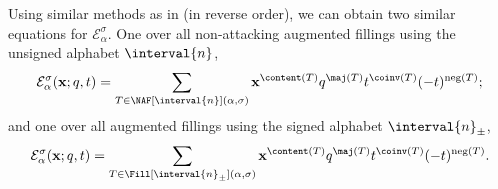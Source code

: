 Using similar methods as in \cite{HHL05} (in reverse order),
we can obtain two similar equations for \(\mathcal{E}_\alpha^\sigma\).
One over all non-attacking augmented fillings using the unsigned alphabet \(\interval{n}\),
\begin{equation} \label{eq:calE-NAF-signed}
	\mathcal{E}^{\sigma}_{\alpha}(\mathbf{x}; q, t) =
	\sum_{T \in \NAF[\interval{n}](\alpha, \sigma)}
	\mathbf{x}^{\content(T)}
	q^{\maj(T)} t^{\coinv(T)}
	(-t)^{\operatorname{neg}(T)};
\end{equation}
and one over all augmented fillings using the signed alphabet \(\interval{n}_\pm\),
\begin{equation} \label{eq:calE-Fill-signed}
	\mathcal{E}^{\sigma}_{\alpha}(\mathbf{x}; q, t) =
	\sum_{T \in \Fill[\interval{n}_\pm](\alpha, \sigma)}
	\mathbf{x}^{\content(T)}
	q^{\maj(T)} t^{\coinv(T)}
	(-t)^{\operatorname{neg}(T)}.
\end{equation}